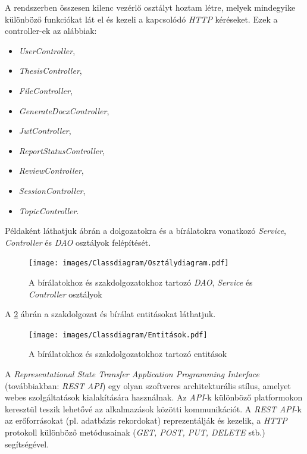 A rendszerben összesen kilenc vezérlő osztályt hoztam létre, melyek mindegyike különböző funkciókat lát el és kezeli a kapcsolódó \textit{HTTP} kéréseket. Ezek a controller-ek az alábbiak:
\begin{itemize}
\setlength\itemsep{0pt}
\item{\textit{UserController}},
\item{\textit{ThesisController}},
\item{\textit{FileController}},
\item{\textit{GenerateDocxController}},
\item{\textit{JwtController}},
\item{\textit{ReportStatusController}},
\item{\textit{ReviewController}},
\item{\textit{SessionController}},
\item{\textit{TopicController}}.

\end{itemize}

Példaként láthatjuk  ábrán a dolgozatokra és a bírálatokra vonatkozó \textit{Service}, \textit{Controller} és \textit{DAO} osztályok felépítését.
\begin{figure}[h!]
	\texttt{[image: images/Classdiagram/Osztálydiagram.pdf]}
	\caption{A bírálatokhoz és szakdolgozatokhoz tartozó \textit{DAO}, \textit{Service} és \textit{Controller} osztályok}
	\label{fig:Osztálydiagram}
\end{figure}
\newpage
A \ref{fig:Entitások} ábrán a szakdolgozat és bírálat entitásokat láthatjuk. 
\begin{figure}[h!]
	\texttt{[image: images/Classdiagram/Entitások.pdf]}
	\caption{A bírálatokhoz és szakdolgozatokhoz tartozó entitások}
	\label{fig:Entitások}
\end{figure}

\newpage


A \textit{Representational State Transfer Application Programming Interface} (továbbiakban: \textit{REST API}) \cite{REST API} egy olyan szoftveres architekturális stílus, amelyet webes szolgáltatások kialakítására használnak. Az \textit{API}-k különböző platformokon keresztül teszik lehetővé az alkalmazások közötti kommunikációt. A \textit{REST API}-k \cite{REST API} az erőforrásokat (pl. adatbázis rekordokat) reprezentálják és kezelik, a \textit{HTTP} \cite{http} protokoll különböző metódusainak (\textit{GET, POST, PUT, DELETE} stb.) segítségével.

